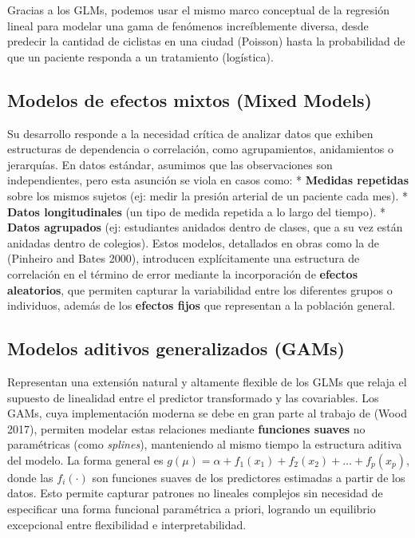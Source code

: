 \documentclass[
  letterpaper,
  DIV=11,
  numbers=noendperiod]{scrreprt}
\begin{document}
Gracias a los GLMs, podemos usar el mismo marco conceptual de la
regresión lineal para modelar una gama de fenómenos increíblemente
diversa, desde predecir la cantidad de ciclistas en una ciudad (Poisson)
hasta la probabilidad de que un paciente responda a un tratamiento
(logística).

\subsection{Modelos de efectos mixtos (Mixed
Models)}\label{modelos-de-efectos-mixtos-mixed-models}

Su desarrollo responde a la necesidad crítica de analizar datos que
exhiben estructuras de dependencia o correlación, como agrupamientos,
anidamientos o jerarquías. En datos estándar, asumimos que las
observaciones son independientes, pero esta asunción se viola en casos
como: * \textbf{Medidas repetidas} sobre los mismos sujetos (ej: medir
la presión arterial de un paciente cada mes). * \textbf{Datos
longitudinales} (un tipo de medida repetida a lo largo del tiempo). *
\textbf{Datos agrupados} (ej: estudiantes anidados dentro de clases, que
a su vez están anidadas dentro de colegios). Estos modelos, detallados
en obras como la de (Pinheiro and Bates 2000), introducen explícitamente
una estructura de correlación en el término de error mediante la
incorporación de \textbf{efectos aleatorios}, que permiten capturar la
variabilidad entre los diferentes grupos o individuos, además de los
\textbf{efectos fijos} que representan a la población general.

\subsection{Modelos aditivos generalizados
(GAMs)}\label{modelos-aditivos-generalizados-gams}

Representan una extensión natural y altamente flexible de los GLMs que
relaja el supuesto de linealidad entre el predictor transformado y las
covariables. Los GAMs, cuya implementación moderna se debe en gran parte
al trabajo de (Wood 2017), permiten modelar estas relaciones mediante
\textbf{funciones suaves} no paramétricas (como \emph{splines}),
manteniendo al mismo tiempo la estructura aditiva del modelo. La forma
general es
\(g(\mu) = \alpha + f_1(x_1) + f_2(x_2) + \ldots + f_p(x_p)\), donde las
\(f_i(\cdot)\) son funciones suaves de los predictores estimadas a
partir de los datos. Esto permite capturar patrones no lineales
complejos sin necesidad de especificar una forma funcional paramétrica a
priori, logrando un equilibrio excepcional entre flexibilidad e
interpretabilidad.
\end{document}
